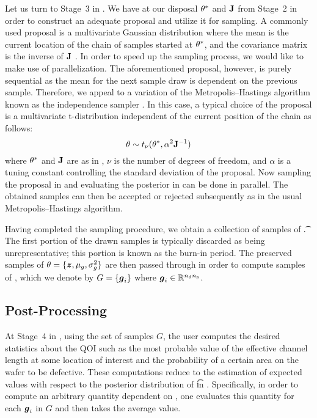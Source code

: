 Let us turn to Stage~3 in . We have at our disposal
$\theta^*$ and $\mathbf{J}$ from Stage~2 in order to construct an adequate proposal and
utilize it for sampling. A commonly used proposal is a multivariate Gaussian
distribution where the mean is the current location of the chain of samples
started at $\theta^*$, and the covariance matrix is the inverse of $\mathbf{J}$
\cite{gelman2004}. In order to speed up the sampling process, we would like to
make use of parallelization. The aforementioned proposal, however, is purely
sequential as the mean for the next sample draw is dependent on the previous
sample. Therefore, we appeal to a variation of the Metropolis--Hastings
algorithm known as the independence sampler \cite{gelman2004}. In this case, a
typical choice of the proposal is a multivariate t-distribution independent of
the current position of the chain as follows:
\begin{equation} \elab{inference-proposal}
  \t \sim t_\nu(\t^*, \alpha^2 \m{J}^{-1})
\end{equation}
where $\theta^*$ and $\mathbf{J}$ are as in , $\nu$ is the
number of degrees of freedom, and $\alpha$ is a tuning constant controlling the
standard deviation of the proposal. Now sampling the proposal in
 and evaluating the posterior in
 can be done in parallel. The obtained samples can
then be accepted or rejected subsequently as in the usual Metropolis--Hastings
algorithm.

Having completed the sampling procedure, we obtain a collection of samples of
\t. The first portion of the drawn samples is typically discarded as being
unrepresentative; this portion is known as the burn-in period. The preserved
samples of $\theta = \{ \boldsymbol{z}, \mu_g, \sigma^2_g \}$ are then passed through
 in order to compute samples of \g, which we denote by
$G = \{ \boldsymbol{g}_i \}$ where $\boldsymbol{g}_i \in \mathbb{R}^{{n_\mathrm{d}} {n_\mathrm{p}}}$.

\subsection{Post-Processing}

At Stage~4 in , using the set of samples $G$, the user
computes the desired statistics about the \ac{QOI} such as the most probable
value of the effective channel length at some location of interest and the
probability of a certain area on the wafer to be defective. These computations
reduce to the estimation of expected values with respect to the posterior
distribution of \t in . Specifically, in order to
compute an arbitrary quantity dependent on \g, one evaluates this quantity for
each $\boldsymbol{g}_i$ in $G$ and then takes the average value.

